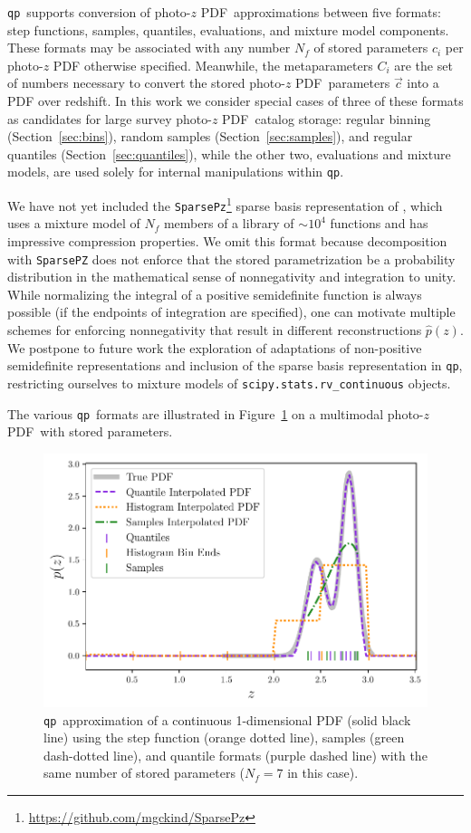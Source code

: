 \documentclass[\docopts]{\docclass}
\newcommand{\qp}{\texttt{qp}}
\newcommand{\pz}{photo-$z$ PDF}
\begin{document}
\qp\ supports conversion of \pz\ approximations between five formats: step 
functions, samples, quantiles, evaluations, and mixture model components.
These formats may be associated with any number $N_{f}$ of stored parameters 
$c_{i}$ per \pz%
otherwise specified.
Meanwhile, the metaparameters $C_{i}$ are the set of numbers necessary to 
convert the stored \pz\ parameters $\vec{c}$ into a PDF over redshift.
In this work we consider special cases of three of these formats as candidates 
for large survey \pz\ catalog storage: regular binning 
(Section~\ref{sec:bins}), random samples (Section~\ref{sec:samples}), and 
regular quantiles (Section~\ref{sec:quantiles}), while the other two, 
evaluations and mixture models, are used solely for internal manipulations 
within \qp.

We have not yet included the 
\texttt{SparsePz}\footnote{\url{https://github.com/mgckind/SparsePz}} sparse 
basis representation of \citet{carrasco_kind_sparse_2014}, which uses a mixture 
model of $N_{f}$ members of a library of $\sim10^{4}$ functions and has 
impressive compression properties.
We omit this format because decomposition with \texttt{SparsePZ} does not 
enforce that the stored parametrization be a probability distribution in the 
mathematical sense of nonnegativity and integration to unity.
While normalizing the integral of a positive semidefinite function is always 
possible (if the endpoints of integration are specified), one can motivate 
multiple schemes for enforcing nonnegativity that result in different 
reconstructions $\hat{p}(z)$.
We postpone to future work the exploration of adaptations of non-positive 
semidefinite representations and inclusion of the sparse basis representation 
in \qp, restricting ourselves to mixture models of 
\texttt{scipy.stats.rv\_continuous} objects.

The various \qp\ formats are illustrated in Figure~\ref{fig:qp} on a multimodal 
\pz\ with stored parameters.
\begin{figure}
  \includegraphics[width=0.9\columnwidth]{figures/demo_pz.pdf}
  \caption{\qp\ approximation of a continuous 1-dimensional PDF (solid black 
line) using the step function (orange dotted line), samples (green dash-dotted 
line), and quantile formats (purple dashed line) with the same number of stored 
parameters ($N_{f}=7$ in this case).
  \label{fig:qp}}
\end{figure}
\end{document}
